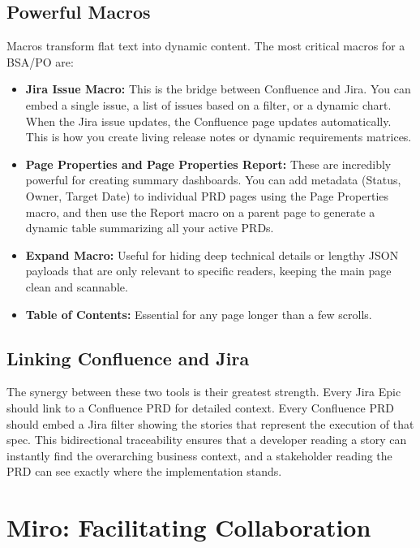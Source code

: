 \documentclass[
  11pt,
  openany,
  oneside]{book}
\providecommand{\tightlist}{%
  \setlength{\itemsep}{0pt}\setlength{\parskip}{0pt}}
\begin{document}
\subsection{Powerful Macros}\label{powerful-macros}

Macros transform flat text into dynamic content. The most critical
macros for a BSA/PO are:

\begin{itemize}
\tightlist
\item
  \textbf{Jira Issue Macro:} This is the bridge between Confluence and
  Jira. You can embed a single issue, a list of issues based on a
  filter, or a dynamic chart. When the Jira issue updates, the
  Confluence page updates automatically. This is how you create living
  release notes or dynamic requirements matrices.
\item
  \textbf{Page Properties and Page Properties Report:} These are
  incredibly powerful for creating summary dashboards. You can add
  metadata (Status, Owner, Target Date) to individual PRD pages using
  the Page Properties macro, and then use the Report macro on a parent
  page to generate a dynamic table summarizing all your active PRDs.
\item
  \textbf{Expand Macro:} Useful for hiding deep technical details or
  lengthy JSON payloads that are only relevant to specific readers,
  keeping the main page clean and scannable.
\item
  \textbf{Table of Contents:} Essential for any page longer than a few
  scrolls.
\end{itemize}

\subsection{Linking Confluence and
Jira}\label{linking-confluence-and-jira}

The synergy between these two tools is their greatest strength. Every
Jira Epic should link to a Confluence PRD for detailed context. Every
Confluence PRD should embed a Jira filter showing the stories that
represent the execution of that spec. This bidirectional traceability
ensures that a developer reading a story can instantly find the
overarching business context, and a stakeholder reading the PRD can see
exactly where the implementation stands.

\section{Miro: Facilitating
Collaboration}\label{miro-facilitating-collaboration}
\end{document}
